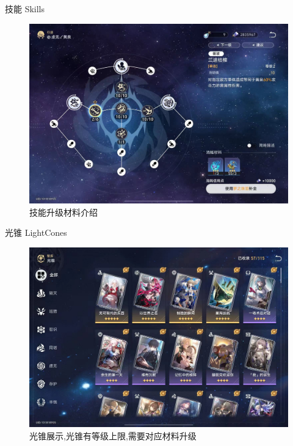 \documentclass{beamer}
\begin{document}
\begin{frame}{技能 Skills}
    \begin{figure}   
        \centering
        \includegraphics[width=0.8\linewidth]{img/1f42c223f24df3012cd99b9a04b29ec.jpg} 
        \caption{技能升级材料介绍}
        \label{Forward and Reverse Process}
        \end{figure}
\end{frame}

\begin{frame}{光锥 LightCones }
    \begin{figure}   
        \centering
        \includegraphics[width=0.8\linewidth]{img/446bed7251f535d2899f540d27a7fa2.jpg} 
        \caption{光锥展示,光锥有等级上限,需要对应材料升级}
        \label{Forward and Reverse Process}
        \end{figure}
\end{frame}
\end{document}
